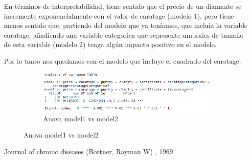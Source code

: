 \documentclass[a4paper, 9pt]{article}
\begin{document}
En términos de interpretabilidad, tiene sentido que el precio de un diamante se incremente exponencialmente con el valor de caratage (modelo 1), pero tiene menos sentido que, partiendo del modelo que ya teníamos, que incluía la variable caratage, añadiendo una variable categorica que represente umbrales de tamaño de esta variable (modelo 2) tenga algún impacto positivo en el modelo.

Por lo tanto nos quedamos con el modelo que incluye el cuadrado del caratage.

\begin{figure}[h!]
  \centering
  \begin{subfigure}[b]{0.8\linewidth}
    \includegraphics[width=\linewidth]{report/images/question-4/anova-exercise4.png}
    \caption{Anova model1 vs model2}
  \end{subfigure}
  \label{fig:coffee}
\end{figure}

\begin{thebibliography}{9}
    Journal of chronic diseases (Bortner, Rayman W)
    , 1969.

\end{thebibliography}
\end{document}
